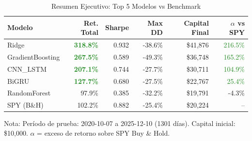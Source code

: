 \begin{table}[htbp]
\centering
\caption{Resumen Ejecutivo: Top 5 Modelos vs Benchmark}
\label{tab:executive_summary}
\begin{tabular}{@{}lrrrrr@{}}
\toprule
\textbf{Modelo} & \textbf{Ret. Total} & \textbf{Sharpe} & \textbf{Max DD} & \textbf{Capital Final} & \textbf{$\alpha$ vs SPY} \\
\midrule
Ridge & \textbf{\textcolor{ForestGreen}{318.8\%}} & 0.932 & -38.6\% & \$41,876 & \textcolor{ForestGreen}{216.5\%} \\
GradientBoosting & \textbf{\textcolor{ForestGreen}{267.5\%}} & 0.589 & -49.3\% & \$36,748 & \textcolor{ForestGreen}{165.2\%} \\
CNN\_LSTM & \textbf{\textcolor{ForestGreen}{207.1\%}} & 0.744 & -27.7\% & \$30,711 & \textcolor{ForestGreen}{104.9\%} \\
BiGRU & \textbf{\textcolor{ForestGreen}{127.7\%}} & 0.680 & -27.5\% & \$22,767 & \textcolor{ForestGreen}{25.4\%} \\
RandomForest & 97.9\% & 0.385 & -32.2\% & \$19,791 & -4.3\% \\
\midrule
SPY (B\&H) & 102.2\% & 0.882 & -25.4\% & \$20,224 & -- \\
\bottomrule
\end{tabular}
\begin{tablenotes}
\small
\item Nota: Per\'iodo de prueba: 2020-10-07 a 2025-12-10 (1301 d\'ias). Capital inicial: \$10,000. $\alpha$ = exceso de retorno sobre SPY Buy \& Hold.
\end{tablenotes}
\end{table}
